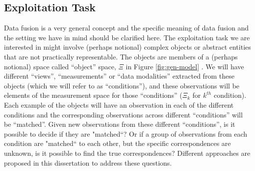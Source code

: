 \documentclass[12pt,oneside,final]{thesis}\usepackage[]{graphicx}\usepackage[]{color}
\begin{document}
\subsection{Exploitation Task}
Data fusion is a very general concept and the specific meaning of data fusion and the setting we have in mind should be clarified here. The exploitation task we are interested in might involve (perhaps notional) complex objects or abstract entities that are not practically representable. The objects are members of a (perhaps notional) space called ``object'' space, $\Xi$ in Figure \ref{fig:gen-model} . We will have different ``views'', ``measurements'' or ``data modalities'' extracted from these objects (which we will refer to as ``conditions''), and these observations will be elements of the measurement space for those ``conditions'' ($\Xi_k$ for $k^{th}$ condition). Each example of the objects will have an observation in each of the different conditions and the corresponding observations across different ``conditions'' will be ``matched''. Given new observations from these different ``conditions'', is it possible to decide if they are "matched``? Or if a group of  observations from each condition are "matched`` to each other, but the specific correspondences are unknown, is it possible to find the true correspondences? Different approaches are proposed in this dissertation to address these questions.
\label{subsec:task}
\end{document}
